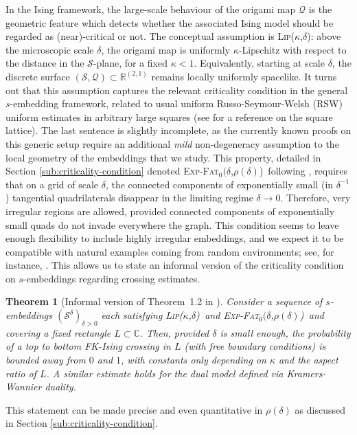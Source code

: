 \documentclass[reqno]{amsart}
\numberwithin{equation}{section}
\newtheorem*{theoremnonum}{Theorem}
\theoremstyle{definition}
\theoremstyle{remark}
\newcommand\cQ{\mathcal{Q}}
\newcommand\cS{\mathcal{S}}
\def\LipKd{{\mbox{\textsc{Lip(}$\kappa$\textsc{,}$\delta$\textsc{)}}}}
\def\ExpFat{{{\mbox{\textsc{Exp-Fat}$_0(\delta$\textsc{,}$\rho(\delta)$\textsc{)}}}}}
\begin{document}
In the Ising framework, the large-scale behaviour of the origami map $\cQ$ is the geometric feature which detects whether the associated Ising model should be regarded as (near)-critical or not. The conceptual assumption is \LipKd: above the microscopic scale $\delta$, the origami map is uniformly $\kappa$-Lipschitz with respect to the distance in the $\cS$-plane, for a fixed $\kappa<1$. Equivalently, starting at scale $\delta$, the discrete surface $(\cS,\cQ)\subset\mathbb{R}^{(2,1)}$ remains locally uniformly spacelike. It turns out that this assumption captures the relevant criticality condition in the general $s$-embedding framework, related to usual uniform Russo-Seymour-Welsh (RSW) uniform estimates in arbitrary large squares (see \cite{DCHN} for a reference on the square lattice). The last sentence is slightly incomplete, as the currently known proofs on this generic setup require an additional \emph{mild} non-degeneracy assumption to the local geometry of the embeddings that we study. This property, detailed in Section \ref{sub:criticality-condition} denoted \ExpFat\ following \cite[Assumption~1.2]{CLR1}, requires that on a grid of scale $\delta$, the connected components of exponentially small (in $\delta^{-1}$) tangential quadrilaterals disappear in the limiting regime $\delta \to 0 $. Therefore, very irregular regions are allowed, provided connected components of exponentially small quads do not invade everywhere the graph. This condition seems to leave enough flexibility to include highly irregular embeddings, and we expect it to be compatible with natural examples coming from random environments; see, for instance, \cite{bou2024random,GJNN,Mah25}. This allows us to state an informal version of the criticality condition on $s$-embeddings regarding crossing estimates.
\begin{theoremnonum}[Informal version of Theorem~1.2 in \cite{Mah23}]\nonumber
	Consider a sequence of $s$-embeddings $(\cS^\delta)_{\delta >0}$ each satisfying \LipKd\, and \ExpFat\, and covering a fixed rectangle $L \subset \mathbb{C}$. Then, provided $\delta $ is small enough, the probability of a top to bottom FK-Ising crossing in $L$ (with free boundary conditions) is bounded away from $0$ and $1$, with constants only depending on $\kappa$ and the aspect ratio of $L$. A similar estimate holds for the dual model defined via Kramers-Wannier duality.
\end{theoremnonum}
\vspace{-2mm}
This statement can be made precise and even quantitative in $\rho(\delta) $ as discussed in Section \ref{sub:criticality-condition}.
\end{document}
